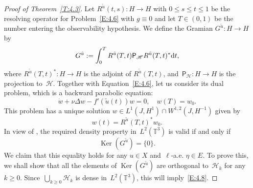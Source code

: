 \documentclass[JEP,XML,SOM,Unicode,ThmDefs]{cedram}
\let\mathcal\mathscr
\theoremstyle{plain}
\numberwithin{equation}{section}
\newcommand{\dd}{{\textup d}}
\newcommand{\T}{{\mathbb T}}
\DeclareMathOperator{\Ker}{Ker}
\newcommand{\HH}{{\mathcal H}}
\begin{document}
\begin{proof}[Proof of Theorem~\ref{T:4.3}]
Let $R^{\tilde u}(t,s):H\to H$ with $0\le s\le t\le 1$ be the resolving operator for Problem~\eqref{E:4.6} with $g\equiv0$ and let $T\in(0,1)$ be the number entering the observability hypothesis. We define the Gramian $G^{\tilde u}:H\to H$ by\vspace*{-3pt}
\begin{equation} \label{E:4.7}
G^{\tilde u}:=\int_0^T R^{\tilde u}(T,t){\mathsf P}_\HH R^{\tilde u}(T,t)^*\dd t,
\end{equation}
where $R^{\tilde u}(T,t)^*:H\to H$ is the adjoint of $R^{\tilde u}(T,t)$, and~${\mathsf P}_\HH: H\to H$ is the projection to~$\HH$. Together with Equation~\eqref{E:4.6}, let us consider its dual problem, which is a backward parabolic equation:\vspace*{-3pt}
\begin{equation} \label{E:4.9}
\dot w+\nu \Delta w-f'(\tilde u(t)) w=0, \quad w(T)=w_0.
\end{equation}
This problem has a unique solution $w\in L^1(J,H^1)\cap W^{1,2}(J,H^{-1})$ given by\vspace*{-3pt}
\begin{equation} \label{E:4.10}
w(t)=R^{\tilde u}(T,t)^*w_0.
\end{equation}
In view of \cite[Part\,IV, Th.\,2.5]{zabczyk2008}, the required density property in~$L^2(\T^3)$ is valid if and only if\vspace*{-3pt}
\begin{equation}\label{E:4.8}
\Ker(G^{\tilde u})=\{0\}.
\end{equation}
We claim that this equality holds for any $u\in X$ and~$\ell$-a.e. $\eta\in E$. To prove this, we shall show that all the elements of $ \Ker(G^{\tilde u})$ are orthogonal to~$\HH_k$ for any~$k\ge0$. Since~$\bigcup_{k\ge0}\HH_k$ is dense in~$L^2(\T^3)$, this will imply~\eqref{E:4.8}.


\end{proof}
\end{document}
